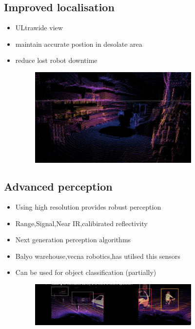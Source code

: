 \documentclass[a4paper]{article}
\begin{document}
\subsection{Improved localisation}
\begin{itemize}
	\item ULtrawide view
	\item maintain accurate postion in desolate area
	\item reduce lost robot downtime
	      \begin{figure}[htpb]
		      \centering
		      \includegraphics[width=0.8\textwidth]{digitalView.png}
		      \caption{}
		      \label{fig:}
	      \end{figure}
\end{itemize}
\subsection{Advanced perception}
\begin{itemize}
	\item Using high resolution provides robust perception
	\item Range,Signal,Near IR,calibirated reflectivity
	\item Next generation perception algorithms
\end{itemize}
\begin{itemize}
	\item Balyo warehouse,vecna robotics,has utilsed this sensors
	\item Can be used for object classification (partially)
	      \begin{figure}[H]
		      \centering
		      \includegraphics[width=0.8\textwidth]{objectClassification.png}
		      \caption{}
		      \label{fig:}
	      \end{figure}
\end{itemize}
\end{document}
